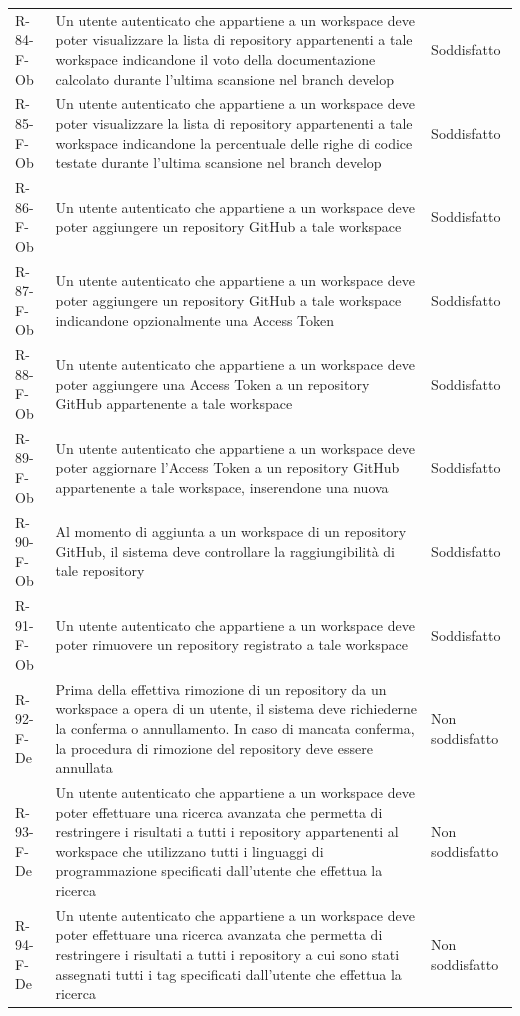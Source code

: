 \documentclass[a4paper, 11pt]{article}
\begin{document}
\begin{longtable}[c]{ >{\centering\arraybackslash}m{2.5cm} >{\centering\arraybackslash}m{8.3cm} >{\centering\arraybackslash}m{3.5cm} }
R-84-F-Ob & Un utente autenticato che appartiene a un workspace deve poter visualizzare la lista di repository appartenenti a tale workspace indicandone il voto della documentazione calcolato durante l'ultima scansione nel branch develop & Soddisfatto\\
R-85-F-Ob & Un utente autenticato che appartiene a un workspace deve poter visualizzare la lista di repository appartenenti a tale workspace indicandone la percentuale delle righe di codice testate durante l'ultima scansione nel branch develop & Soddisfatto\\
R-86-F-Ob & Un utente autenticato che appartiene a un workspace deve poter aggiungere un repository GitHub a tale workspace & Soddisfatto\\
R-87-F-Ob & Un utente autenticato che appartiene a un workspace deve poter aggiungere un repository GitHub a tale workspace indicandone opzionalmente una Access Token & Soddisfatto\\
R-88-F-Ob & Un utente autenticato che appartiene a un workspace deve poter aggiungere una Access Token a un repository GitHub appartenente a tale workspace & Soddisfatto\\
R-89-F-Ob & Un utente autenticato che appartiene a un workspace deve poter aggiornare l'Access Token a un repository GitHub appartenente a tale workspace, inserendone una nuova & Soddisfatto\\
R-90-F-Ob & Al momento di aggiunta a un workspace di un repository GitHub, il sistema deve controllare la raggiungibilità di tale repository & Soddisfatto\\
R-91-F-Ob & Un utente autenticato che appartiene a un workspace deve poter rimuovere un repository registrato a tale workspace & Soddisfatto\\
R-92-F-De & Prima della effettiva rimozione di un repository da un workspace a opera di un utente, il sistema deve richiederne la conferma o annullamento. In caso di mancata conferma, la procedura di rimozione del repository deve essere annullata & Non soddisfatto\\
R-93-F-De & Un utente autenticato che appartiene a un workspace deve poter effettuare una ricerca avanzata che permetta di restringere i risultati a tutti i repository appartenenti al workspace che utilizzano tutti i linguaggi di programmazione specificati dall'utente che effettua la ricerca & Non soddisfatto\\
R-94-F-De & Un utente autenticato che appartiene a un workspace deve poter effettuare una ricerca avanzata che permetta di restringere i risultati a tutti i repository a cui sono stati assegnati tutti i tag specificati dall'utente che effettua la ricerca & Non soddisfatto\\

\end{longtable}
\end{document}

